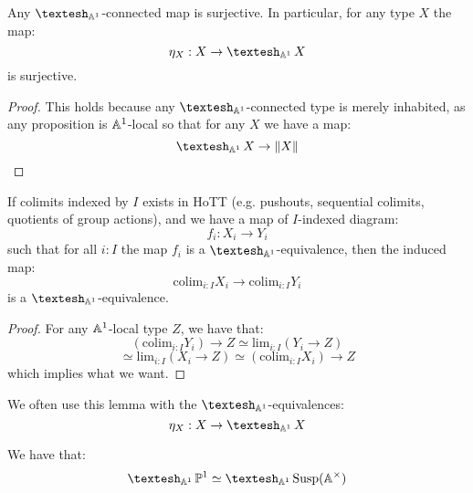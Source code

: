 \begin{lemma}
Any $\shape_{\A^1}$-connected map is surjective. In particular, for any type $X$ the map:
\[\eta_X:X\to \shape_{\A^1}X\]
is surjective.
\end{lemma}

\begin{proof}
This holds because any $\shape_{\A^1}$-connected type is merely inhabited, as any proposition is $\mathbb{A}^1$-local so that for any $X$ we have a map:
\[\shape_{\A^1}X \to \propTrunc{X}\]
\end{proof}



\begin{lemma}\label{colimit-shape}
If colimits indexed by $I$ exists in HoTT (e.g. pushouts, sequential colimits, quotients of group actions), and we have a map of $I$-indexed diagram:
\[f_i : X_i \to Y_i\]
such that for all $i:I$ the map $f_i$ is a $\shape_{\A^1}$-equivalence, then the induced map: 
\[\mathrm{colim}_{i:I} X_i \to \mathrm{colim}_{i:I} Y_i\]
is a $\shape_{\A^1}$-equivalence.
\end{lemma}

\begin{proof}
For any $\mathbb{A}^1$-local type $Z$, we have that:
\[(\mathrm{colim}_{i:I} Y_i) \to Z \simeq \mathrm{lim}_{i:I} (Y_i \to Z)\]
\[\simeq \mathrm{lim}_{i:I} (X_i \to Z) \simeq (\mathrm{colim}_{i:I} X_i) \to Z\]
which implies what we want.
\end{proof}

We often use this lemma with the $\shape_{\A^1}$-equivalences:
\[\eta_X : X \to \shape_{\A^1} X\]

\begin{proposition}
We have that:
\[\shape_{\A^1} \bP^1 \simeq \shape_{\A^1} \Susp(\A^\times)\]
\end{proposition}

